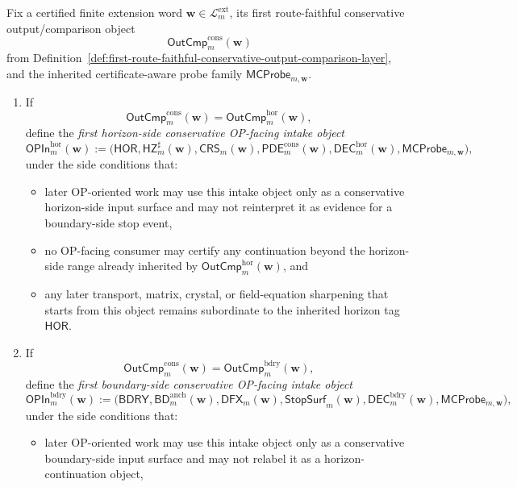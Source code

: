 \begin{definition}
\label{def:first-conservative-op-facing-intake-layer}
Fix a certified finite extension word \(\mathbf w\in\mathcal L^{\mathrm{ext}}_{m}\), its first route-faithful conservative output/comparison object
\[
  \mathsf{OutCmp}^{\mathrm{cons}}_{m}(\mathbf w)
\]
from Definition~\ref{def:first-route-faithful-conservative-output-comparison-layer}, and the inherited certificate-aware probe family \(\mathsf{MCProbe}_{m,\mathbf w}\).
\begin{enumerate}[label=(\roman*)]
  \item If
  \[
    \mathsf{OutCmp}^{\mathrm{cons}}_{m}(\mathbf w)=\mathsf{OutCmp}^{\mathrm{hor}}_{m}(\mathbf w),
  \]
  define the \emph{first horizon-side conservative OP-facing intake object}
  \[
    \mathsf{OPIn}^{\mathrm{hor}}_{m}(\mathbf w)
    :=
    \bigl(\mathsf{HOR},\mathsf{HZ}^{\sharp}_{m}(\mathbf w),\mathsf{CRS}_{m}(\mathbf w),\mathsf{PDE}^{\mathrm{cons}}_{m}(\mathbf w),\mathsf{DEC}^{\mathrm{hor}}_{m}(\mathbf w),\mathsf{MCProbe}_{m,\mathbf w}\bigr),
  \]
  under the side conditions that:
  \begin{itemize}[leftmargin=2em]
    \item later OP-oriented work may use this intake object only as a conservative horizon-side input surface and may not reinterpret it as evidence for a boundary-side stop event,
    \item no OP-facing consumer may certify any continuation beyond the horizon-side range already inherited by \(\mathsf{OutCmp}^{\mathrm{hor}}_{m}(\mathbf w)\), and
    \item any later transport, matrix, crystal, or field-equation sharpening that starts from this object remains subordinate to the inherited horizon tag \(\mathsf{HOR}\).
  \end{itemize}
  \item If
  \[
    \mathsf{OutCmp}^{\mathrm{cons}}_{m}(\mathbf w)=\mathsf{OutCmp}^{\mathrm{bdry}}_{m}(\mathbf w),
  \]
  define the \emph{first boundary-side conservative OP-facing intake object}
  \[
    \mathsf{OPIn}^{\mathrm{bdry}}_{m}(\mathbf w)
    :=
    \bigl(\mathsf{BDRY},\mathsf{BD}^{\mathrm{anch}}_{m}(\mathbf w),\mathsf{DFX}_{m}(\mathbf w),\mathsf{StopSurf}_{m}(\mathbf w),\mathsf{DEC}^{\mathrm{bdry}}_{m}(\mathbf w),\mathsf{MCProbe}_{m,\mathbf w}\bigr),
  \]
  under the side conditions that:
  \begin{itemize}[leftmargin=2em]
    \item later OP-oriented work may use this intake object only as a conservative boundary-side input surface and may not relabel it as a horizon-continuation object,

\end{itemize}
\end{enumerate}
\end{definition}
